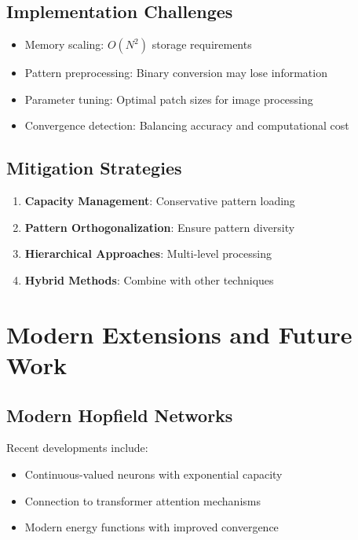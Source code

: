 \documentclass[11pt,a4paper]{article}
\begin{document}
\subsection{Implementation Challenges}

\begin{itemize}
    \item Memory scaling: $O(N^2)$ storage requirements
    \item Pattern preprocessing: Binary conversion may lose information
    \item Parameter tuning: Optimal patch sizes for image processing
    \item Convergence detection: Balancing accuracy and computational cost
\end{itemize}

\subsection{Mitigation Strategies}

\begin{enumerate}
    \item \textbf{Capacity Management}: Conservative pattern loading
    \item \textbf{Pattern Orthogonalization}: Ensure pattern diversity
    \item \textbf{Hierarchical Approaches}: Multi-level processing
    \item \textbf{Hybrid Methods}: Combine with other techniques
\end{enumerate}

\section{Modern Extensions and Future Work}

\subsection{Modern Hopfield Networks}

Recent developments include:
\begin{itemize}
    \item Continuous-valued neurons with exponential capacity
    \item Connection to transformer attention mechanisms
    \item Modern energy functions with improved convergence
\end{itemize}
\end{document}
